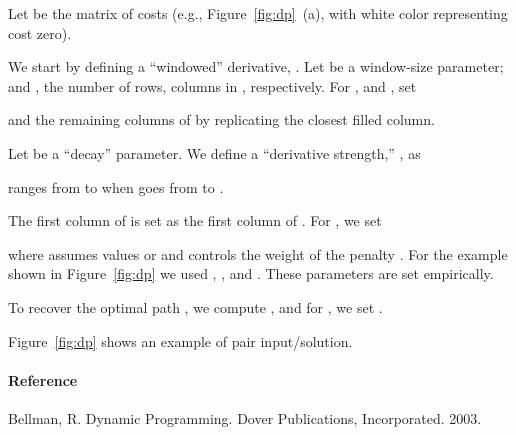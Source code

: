 \documentclass[a4paper,twoside]{article}
\begin{document}
Let  be the matrix of costs (e.g., Figure~\ref{fig:dp}~(a), with white color
representing cost zero).

We start by defining a ``windowed'' derivative, .
Let  be a window-size parameter; and ,  the number of rows, columns in ,
respectively. For , and ,
set


and the remaining columns of  by replicating the closest filled column.

Let  be a ``decay'' parameter. We define a ``derivative strength,'' ,
as


 ranges from  to  when  goes from  to .

The first column of  is set as the first column of .
For , we set

\vspace{-0.5cm}


\noindent
where  assumes values  or  and  controls the
weight of the penalty .
For the example shown in Figure~\ref{fig:dp} we used , ,
and . These parameters are set empirically.

To recover the optimal path , we compute
, and for
, we set .

Figure~\ref{fig:dp} shows an example of pair input/solution.

\paragraph{Reference}
Bellman, R. Dynamic Programming. Dover Publications, Incorporated. 2003.
\end{document}
